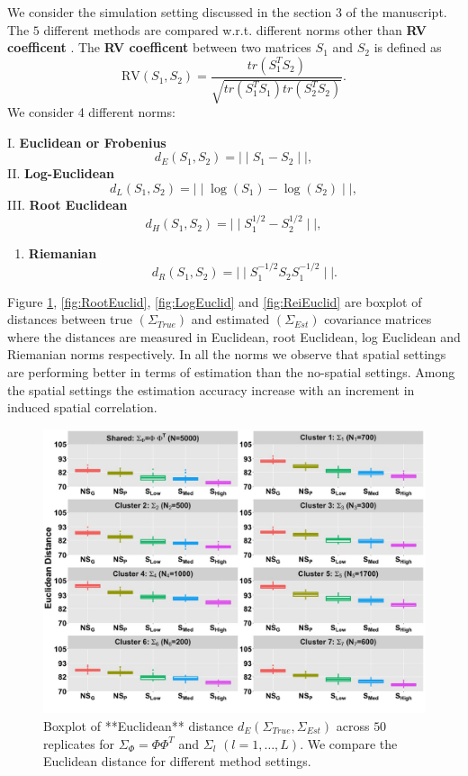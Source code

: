 \documentclass[
]{book}
\providecommand{\tightlist}{%
  \setlength{\itemsep}{0pt}\setlength{\parskip}{0pt}}
\begin{document}
We consider the simulation setting discussed in the section 3 of the manuscript. The \(5\) different methods are compared w.r.t. different norms other than \textbf{RV coefficent} \citep{robert1976unifying}. The \textbf{RV coefficent} between two matrices \(S_{1}\) and \(S_{2}\) is defined as \[\text{RV}(S_{1},S_{2}) = \frac{ tr(  S_{1}^{T} S_{2} ) }{ \sqrt{ tr(  S_{1}^{T} S_{1} )  tr(  S_{2}^{T} S_{2} ) }  }.\] We consider 4 different norms:

I. \textbf{Euclidean or Frobenius}
\[
d_{E}(S_{1},S_{2}) = \mid \mid S_{1} - S_{2} \mid \mid, 
\]
II. \textbf{Log-Euclidean}
\[
d_{L}(S_{1},S_{2}) = \mid \mid \log(S_{1}) - \log(S_{2}) \mid \mid,
\]
III. \textbf{Root Euclidean}
\[
d_{H}(S_{1},S_{2}) = \mid \mid S_{1}^{1/2} - S_{2}^{1/2} \mid \mid, 
\]

\begin{enumerate}
\def\labelenumi{\Roman{enumi}.}
\setcounter{enumi}{3}
\tightlist
\item
  \textbf{Riemanian}
  \[
  d_{R}(S_{1},S_{2}) = \mid \mid S_{1}^{-1/2} S_{2} S_{1}^{-1/2} \mid \mid.
  \]
\end{enumerate}

Figure \ref{fig:Euclid}, \ref{fig:RootEuclid}, \ref{fig:LogEuclid} and \ref{fig:ReiEuclid} are boxplot of distances between true \((\Sigma_{True})\) and estimated \((\Sigma_{Est})\) covariance matrices where the distances are measured in Euclidean, root Euclidean, log Euclidean and Riemanian norms \citep{dryden2009non} respectively. In all the norms we observe that spatial settings are performing better in terms of estimation than the no-spatial settings. Among the spatial settings the estimation accuracy increase with an increment in induced spatial correlation.

\begin{figure}

{\centering \includegraphics[width=0.8\linewidth]{images/Distance_Euclidean_plot} 

}

\caption{Boxplot of **Euclidean** distance $d_E(\Sigma_{True}, \Sigma_{Est})$ across  $50$ replicates for $\Sigma_{\Phi} = \Phi \Phi^{T}$ and $\Sigma_{l}$ $(l = 1, \dots , L)$. We compare the Euclidean distance for different method settings.}\label{fig:Euclid}
\end{figure}
\end{document}
